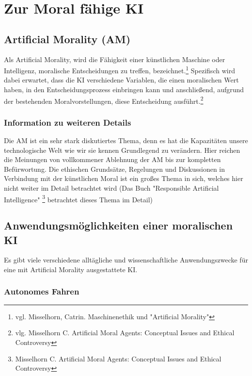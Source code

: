 \section{Zur Moral fähige KI}\label{sec::moralische KI}

\subsection{Artificial Morality (AM)}\label{subsec::artificial morality}

Als Artificial Morality, wird die Fähigkeit einer künstlichen Maschine oder Intelligenz, moralische Entscheidungen zu
treffen, bezeichnet.\footnote{vgl. Misselhorn, Catrin. Maschinenethik und "Artificial Morality"} Spezifisch
wird dabei erwartet, dass die KI verschiedene Variablen, die einen moralischen Wert haben, in den Entscheidungsprozess
einbringen kann und anschließend, aufgrund der bestehenden Moralvorstellungen, diese Entscheidung ausführt.\footnote{vlg. Misselhorn C. Artificial Moral Agents: Conceptual Issues and Ethical Controversy}

\subsubsection{Information zu weiteren Details}

Die AM ist ein sehr stark diskutiertes Thema, denn es hat die Kapazitäten unsere technologische Welt wie wir sie kennen
Grundlegend zu verändern.
Hier reichen die Meinungen von vollkommener Ablehnung der AM bis zur kompletten Befürwortung.
Die ethischen Grundsätze, Regelungen und Diskussionen in Verbindung mit der künstlichen Moral ist ein großes Thema
in sich, welches hier nicht weiter im Detail betrachtet wird (Das Buch "Responsible Artificial Intelligence"
\footnote{Misselhorn C. Artificial Moral Agents: Conceptual Issues and Ethical Controversy} betrachtet dieses Thema im Detail)

\subsection{Anwendungsmöglichkeiten einer moralischen KI}\label{subsec::anwendungen}

Es gibt viele verschiedene alltägliche und wissenschaftliche Anwendungszwecke für eine mit Artificial Morality ausgestattete KI\@.

\subsubsection{Autonomes Fahren}\label{subsubsec::autonomes fahren}


